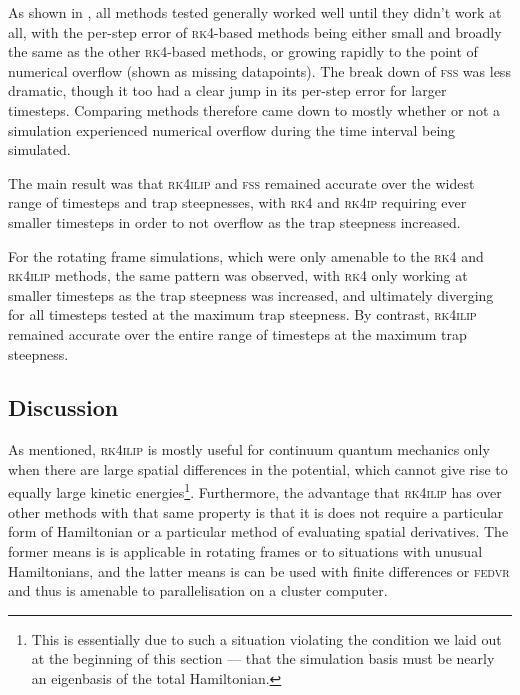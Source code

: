 As shown in , all methods tested generally worked well until they didn't work at all, with the per-step error of \textsc{rk4}-based methods being either small and broadly the same as the other \textsc{rk4}-based methods, or growing rapidly to the point of numerical overflow (shown as missing datapoints). The break down of \textsc{fss} was less dramatic, though it too had a clear jump in its per-step error for larger timesteps. Comparing methods therefore came down to mostly whether or not a simulation experienced numerical overflow during the time interval being simulated.

The main result was that \textsc{rk4ilip} and \textsc{fss} remained accurate over the widest range of timesteps and trap steepnesses, with \textsc{rk4} and \textsc{rk4ip} requiring ever smaller timesteps in order to not overflow as the trap steepness increased.

For the rotating frame simulations, which were only amenable to the \textsc{rk4} and \textsc{rk4ilip} methods, the same pattern was observed, with \textsc{rk4} only working at smaller timesteps as the trap steepness was increased, and ultimately diverging for all timesteps tested at the maximum trap steepness. By contrast, \textsc{rk4ilip} remained accurate over the entire range of timesteps at the maximum trap steepness.

\subsection{Discussion}

As mentioned, \textsc{rk4ilip} is mostly useful for continuum quantum mechanics only when there are large spatial differences in the potential, which cannot give rise to equally large kinetic energies\footnote{This is essentially due to such a situation violating the condition we laid out at the beginning of this section --- that the simulation basis must be nearly an eigenbasis of the total Hamiltonian.}. Furthermore, the advantage that \textsc{rk4ilip} has over other methods with that same property is that it is does not require a particular form of Hamiltonian or a particular method of evaluating spatial derivatives. The former means is is applicable in rotating frames or to situations with unusual Hamiltonians, and the latter means is can be used with finite differences or \textsc{fedvr} \cite{schneider2006} and thus is amenable to parallelisation on a cluster computer.

